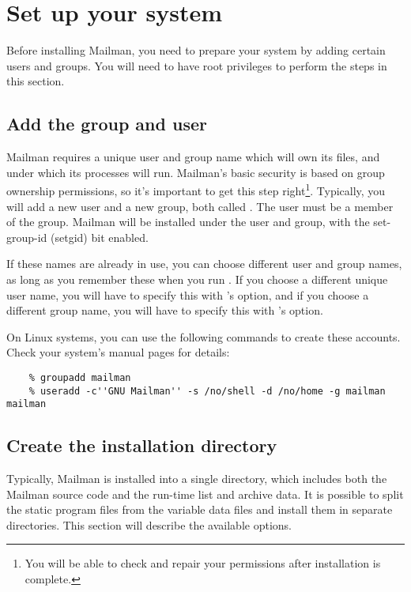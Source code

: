 \documentclass{howto}
\begin{document}
\section{Set up your system}

Before installing Mailman, you need to prepare your system by adding certain
users and groups.  You will need to have root privileges to perform the steps
in this section.

\subsection{Add the group and user}

Mailman requires a unique user and group name which will own its files, and
under which its processes will run.  Mailman's basic security is based on
group ownership permissions, so it's important to get this step
right\footnote{You will be able to check and repair your permissions after
installation is complete.}.  Typically, you will add a new user and a new
group, both called .  The  user must be a member
of the  group.  Mailman will be installed under the
 user and group, with the set-group-id (setgid) bit enabled.

If these names are already in use, you can choose different user and group
names, as long as you remember these when you run .  If you
choose a different unique user name, you will have to specify this with
's  option, and if you choose
a different group name, you will have to specify this with
's  option.

On Linux systems, you can use the following commands to create these
accounts.  Check your system's manual pages for details:

\begin{verbatim}
    % groupadd mailman
    % useradd -c''GNU Mailman'' -s /no/shell -d /no/home -g mailman mailman
\end{verbatim}

\subsection{Create the installation directory\label{create-install-dir}}
Typically, Mailman is installed into a single directory, which includes both
the Mailman source code and the run-time list and archive data.  It is
possible to split the static program files from the variable data files and
install them in separate directories.  This section will describe the
available options.
\end{document}

